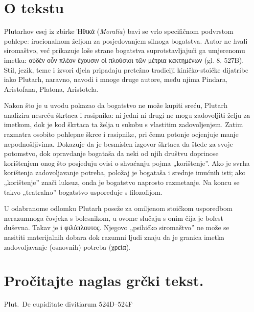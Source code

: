 


\section*{O tekstu}

Plutarhov esej iz zbirke Ἠθικά (\textit{Moralia}) bavi se vrlo specifičnom podvrstom pohlepe: iracionalnom željom za posjedovanjem silnoga bogatstva. Autor ne hvali siromaštvo, već prikazuje loše strane bogatstva suprotstavljajući ga umjerenomu imetku: \textgreek[variant=ancient]{οὐδὲν οὖν πλέον ἔχουσιν οἱ πλούσιοι τῶν μέτρια κεκτημένων} (gl. 8, 527B). Stil, jezik, teme i izvori djela pripadaju pretežno tradiciji kiničko-stoičke dijatribe iako Plutarh, naravno, navodi i mnoge druge autore, među njima Pindara, Aristofana, Platona, Aristotela.

Nakon što je u uvodu pokazao da bogatstvo ne može kupiti sreću, Plutarh analizira nesreću škrtaca i rasipnika: ni jedni ni drugi ne mogu zadovoljiti želju za imetkom, dok je kod škrtaca ta želja u sukobu s vlastitim zadovoljenjem. Zatim razmatra osobito pohlepne škrce i rasipnike, pri čemu potonje ocjenjuje manje nepodnošljivima. Dokazuje da je besmislen izgovor škrtaca da štede za svoje potomstvo, dok opravdanje bogataša da neki od njih društvu doprinose korištenjem onog što posjeduju ovisi o shvaćanju pojma „korištenje”. Ako je svrha korištenja zadovoljavanje potreba, položaj je bogataša i srednje imućnih isti; ako „korištenje” znači luksuz, onda je bogatstvo naprosto razmetanje. Na koncu se takvo „teatralno” bogatstvo uspoređuje s filozofijom.

U odabranome odlomku Plutarh poseže za omiljenom stoičkom usporedbom nerazumnoga čovjeka s bolesnikom, u ovome slučaju s onim čija je bolest duševna. Takav je i \textgreek[variant=ancient]{φιλόπλουτος.} Njegovo „psihičko siromaštvo” ne može se nasititi materijalnih dobara dok razumni ljudi znaju da je granica imetka zadovoljavanje (osnovnih) potreba \textgreek[variant=ancient]{(χρεία).}


\section*{Pročitajte naglas grčki tekst.}

Plut.\ De cupiditate divitiarum 524D–524F


